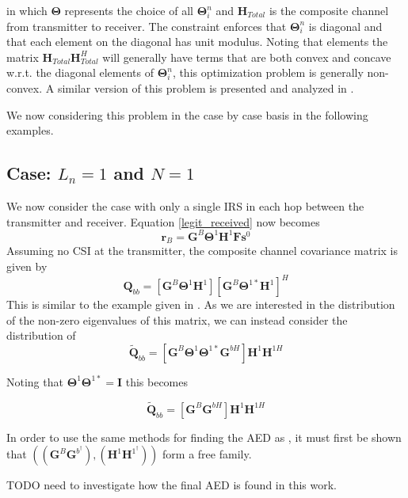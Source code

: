 \documentclass[12pt,a4paper]{report}
\begin{document}
in which $\boldsymbol{\Theta}$ represents the choice of all $\boldsymbol{\Theta}^n_i$ and $\mathbf{H}_{Total}$ is the composite channel from transmitter to receiver. The constraint enforces that $\boldsymbol{\Theta}^n_i$ is diagonal and that each element on the diagonal has unit modulus. 
Noting that elements the matrix  $\mathbf{H}_{Total}\mathbf{H}_{Total}^H$ will generally have terms that are both convex and concave w.r.t. the diagonal elements of $\boldsymbol{\Theta}^n_i$, this optimization problem is generally non-convex. A similar version of this problem is presented and analyzed in \cite{wu2019intelligent}.
\par
We now considering this problem in the case by case basis in the following examples. 


\subsection{Case: $L_n=1$ and $N=1$}
We now consider the case with only a single IRS in each hop between the transmitter and receiver. 
Equation \ref{legit_received} now becomes 
	\begin{equation}
\mathbf{r}_{B} =  \mathbf{G}^{B}\boldsymbol{\Theta}^{1}\mathbf{H}^{1}\mathbf{F}\mathbf{s}^0
\end{equation}
Assuming no CSI at the transmitter, the composite channel covariance matrix is given by 
\begin{equation}
\mathbf{Q}_{bb} = [\mathbf{G}^{B}\boldsymbol{\Theta}^{1}\mathbf{H}^{1}][\mathbf{G}^{B}\boldsymbol{\Theta}^{1*}\mathbf{H}^{1}]^H
\end{equation}
This is similar to the example given in \cite[Section 4.10]{muller2013applications}. As we are interested in the distribution of the non-zero eigenvalues of this matrix, we can instead consider the distribution of 
\begin{equation}
\tilde{\mathbf{Q}}_{bb} = [\mathbf{G}^{B}\boldsymbol{\Theta}^{1} \boldsymbol{\Theta}^{1*}\mathbf{G}^{bH}]\mathbf{H}^{1}\mathbf{H}^{1H}
\end{equation}

Noting that $\boldsymbol{\Theta}^{1}\boldsymbol{\Theta}^{1*} = \mathbf{I}$ this becomes

\begin{equation}
\tilde{\mathbf{Q}}_{bb} = [\mathbf{G}^{B}\mathbf{G}^{bH}]\mathbf{H}^{1}\mathbf{H}^{1H}
\end{equation}

In order to use the same methods for finding the AED as \cite[Section 4.10]{muller2013applications}, it must first be shown that $\left(\left( \mathbf{G}^{B}\mathbf{G}^{b^\dagger }\right)
,\left( \mathbf{H}^{1}\mathbf{H}^{1^\dagger} \right)
\right)$
form a free family. 
\par
TODO need to investigate how the final AED is found in this work.
\end{document}
